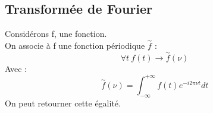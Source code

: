 \subsection{Transformée de Fourier}
\begin{de}
Considérons f, une fonction.\\
On associe à f une fonction périodique $\overset{\sim}f$ : 
$$\forall t~ f(t) \rightarrow \overset{\sim}f(\nu)$$
Avec : 
$$\overset{\sim}f(\nu) = \int_{-\infty}^{+\infty} f(t)e^{-i2\pi\nu t}dt$$
On peut retourner cette égalité.
\end{de}


